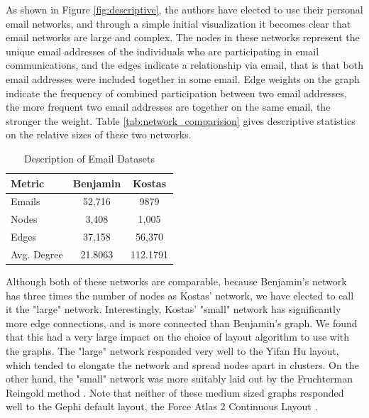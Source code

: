 \documentclass[11pt,letterpaper]{article}
\begin{document}
As shown in Figure \ref{fig:descriptive}, the authors have elected to use their personal email networks, and through a simple initial visualization it becomes clear that email networks are large and complex.  The nodes in these networks represent the unique email addresses of the individuals who are participating in email communications, and the edges indicate a relationship via email, that is that both email addresses were included together in some email. Edge weights on the graph indicate the frequency of combined participation between two email addresses, the more frequent two email addresses are together on the same email, the stronger the weight. Table \ref{tab:network_comparision} gives descriptive statistics on the relative sizes of these two networks.

\begin{table}[t!]
    \centering
    \label{tab:network_comparison}
    \begin{tabular}{l | c c}
        \hline
        Metric & Benjamin & Kostas \\
        \hline
        Emails & 52,716 & 9879 \\
        Nodes & 3,408 & 1,005 \\
        Edges & 37,158 & 56,370 \\
        Avg. Degree & 21.8063 & 112.1791 \\
        \hline
    \end{tabular}
    \caption{Description of Email Datasets}
\end{table}

Although both of these networks are comparable, because Benjamin's network has three times the number of nodes as Kostas' network, we have elected to call it the "large" network. Interestingly, Kostas' "small" network has significantly more edge connections, and is more connected than Benjamin's graph. We found that this had a very large impact on the choice of layout algorithm to use with the graphs. The "large" network responded very well to the Yifan Hu \cite{hu_efficient_2005} layout, which tended to elongate the network and spread nodes apart in clusters. On the other hand, the "small" network was more suitably laid out by the Fruchterman Reingold method \cite{fruchterman_graph_1991}. Note that neither of these medium sized graphs responded well to the Gephi default layout, the Force Atlas 2 Continuous Layout \cite{jacomy_forceatlas2_2014}.
\end{document}
